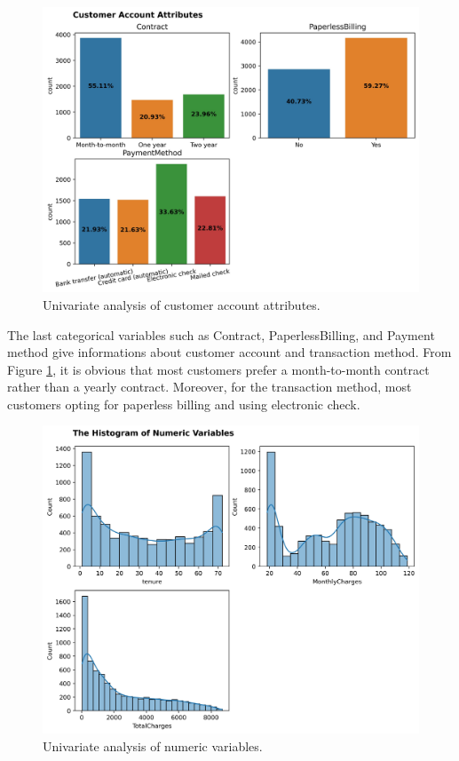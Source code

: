 \begin{figure}[t]
	\centering
	\includegraphics[width=1\linewidth]{figures/customer_acc}
	\caption{Univariate analysis of customer account attributes.}
	\label{fig:customer_acc}
\end{figure}

The last categorical variables such as Contract, PaperlessBilling, and Payment method give informations about customer account and transaction method. From Figure \ref{fig:customer_acc}, it is obvious that most customers prefer a month-to-month contract rather than a yearly contract. Moreover, for the transaction method, most customers opting for paperless billing and using electronic check.

\begin{figure}[t]
	\centering
	\includegraphics[width=1\linewidth]{figures/numeric_univ}
	\caption{Univariate analysis of numeric variables.}
	\label{fig:numeric_univ}
\end{figure}

